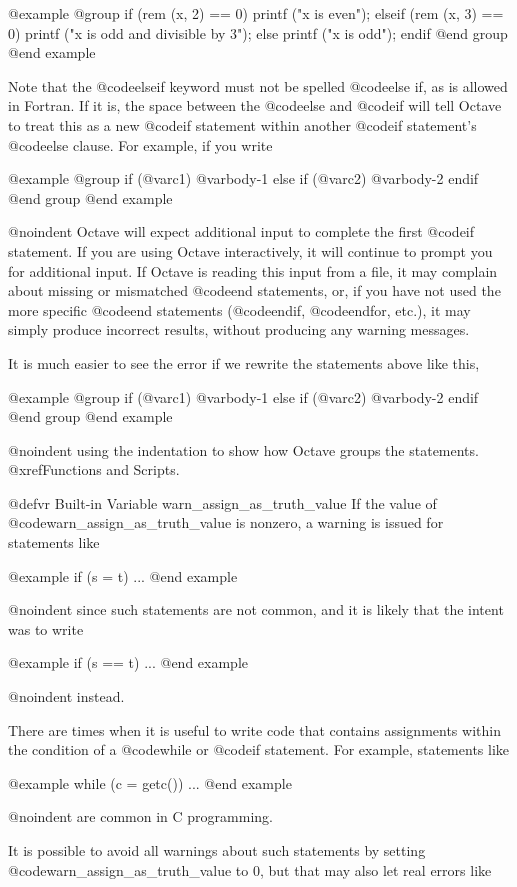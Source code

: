 @example
@group
if (rem (x, 2) == 0)
  printf ("x is even\n");
elseif (rem (x, 3) == 0)
  printf ("x is odd and divisible by 3\n");
else
  printf ("x is odd\n");
endif
@end group
@end example

Note that the @code{elseif} keyword must not be spelled @code{else if},
as is allowed in Fortran.  If it is, the space between the @code{else}
and @code{if} will tell Octave to treat this as a new @code{if}
statement within another @code{if} statement's @code{else} clause.  For
example, if you write

@example
@group
if (@var{c1})
  @var{body-1}
else if (@var{c2})
  @var{body-2}
endif
@end group
@end example

@noindent
Octave will expect additional input to complete the first @code{if}
statement.  If you are using Octave interactively, it will continue to
prompt you for additional input.  If Octave is reading this input from a
file, it may complain about missing or mismatched @code{end} statements,
or, if you have not used the more specific @code{end} statements
(@code{endif}, @code{endfor}, etc.), it may simply produce incorrect
results, without producing any warning messages.

It is much easier to see the error if we rewrite the statements above
like this,

@example
@group
if (@var{c1})
  @var{body-1}
else
  if (@var{c2})
    @var{body-2}
  endif
@end group
@end example

@noindent
using the indentation to show how Octave groups the statements.
@xref{Functions and Scripts}.

@defvr {Built-in Variable} warn_assign_as_truth_value
If the value of @code{warn_assign_as_truth_value} is nonzero, a
warning is issued for statements like

@example
if (s = t)
  ...
@end example

@noindent
since such statements are not common, and it is likely that the intent
was to write

@example
if (s == t)
  ...
@end example

@noindent
instead.

There are times when it is useful to write code that contains
assignments within the condition of a @code{while} or @code{if}
statement.  For example, statements like

@example
while (c = getc())
  ...
@end example

@noindent
are common in C programming.

It is possible to avoid all warnings about such statements by setting
@code{warn_assign_as_truth_value} to 0, but that may also
let real errors like

